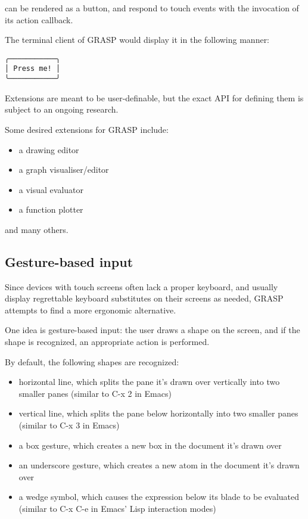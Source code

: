 \documentclass[11pt]{article}
\begin{document}
can be rendered as a button, and respond
to touch events with the invocation of its
action callback.

The terminal client of GRASP would display
it in the following manner:

\begin{verbatim}
╭───────────╮
│ Press me! │
╰───────────╯
\end{verbatim}

Extensions are meant to be user-definable, but
the exact API for defining them is subject to
an ongoing research.

Some desired extensions for GRASP include:
\begin{itemize}
\item a drawing editor
\item a graph visualiser/editor
\item a visual evaluator
\item a function plotter
\end{itemize}

and many others.

\subsection{Gesture-based input}
\label{sec:org985195f}

Since devices with touch screens often lack
a proper keyboard, and usually display regrettable
keyboard substitutes on their screens as needed,
GRASP attempts to find a more ergonomic alternative.

One idea is gesture-based input: the user draws
a shape on the screen, and if the shape is recognized,
an appropriate action is performed.

By default, the following shapes are recognized:
\begin{itemize}
\item horizontal line, which splits the pane it's
drawn over vertically into two smaller panes
(similar to C-x 2 in Emacs)

\item vertical line, which splits the pane below
horizontally into two smaller panes
(similar to C-x 3 in Emacs)

\item a box gesture, which creates a new box in the
document it's drawn over

\item an underscore gesture, which creates a new atom
in the document it's drawn over

\item a wedge symbol, which causes the expression
below its blade to be evaluated (similar to
C-x C-e in Emacs' Lisp interaction modes)
\end{itemize}
\end{document}
